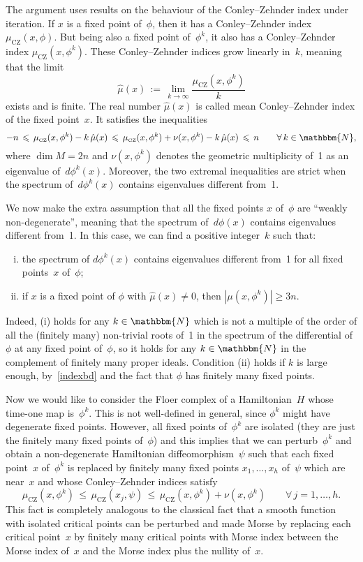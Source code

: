 \documentclass[12pt,twoside]{amsart}
\theoremstyle{plain}
\numberwithin{figure}{section}
\numberwithin{equation}{section}
\def\sCZ{ {\scriptscriptstyle\operatorname{CZ}}}
\def\NN{\mathbbm{N}}
\begin{document}
The argument uses results on the behaviour of the Conley--Zehnder index under iteration. 
If $x$ is a fixed point of~$\phi$, then it has a Conley--Zehnder index $\mu_{\sCZ}(x,\phi)$. 
But being also a fixed point of~$\phi^k$, it also has a Conley--Zehnder index $\mu_{\sCZ}(x,\phi^k)$. 
These Conley--Zehnder indices grow linearly in~$k$, meaning that the limit
\[
\hat{\mu}(x) \,:=\, \lim_{k \rightarrow \infty} \frac{\mu_{\sCZ}(x,\phi^k)}{k}
\]
exists and is finite. The real number $\hat{\mu}(x)$ is called mean Conley--Zehnder index of the fixed point~$x$. It satisfies the inequalities 
\begin{equation}
\label{indexbd}
-n \,\leqslant\,  \mu_{\sCZ}(x,\phi^k) - k \, \hat{\mu}(x) \,\leqslant\, 
\mu_{\sCZ}(x,\phi^k) + \nu(x,\phi^k) - k \, \hat{\mu}(x)  \,\leqslant\, n \qquad \forall\, k\in \NN, 
\end{equation}
%
where $\dim M=2n$ and $\nu(x,\phi^k)$ denotes the geometric multiplicity of~1 as an eigenvalue 
of~$d\phi^k(x)$. Moreover, the two extremal inequalities are strict when the spectrum 
of~$d\phi^k(x)$ contains eigenvalues different from~1.

We now make the extra assumption that all the fixed points $x$ of~$\phi$ are 
``weakly non-degenerate'', meaning that the spectrum of~$d\phi(x)$ contains eigenvalues 
different from~1. In this case, we can find a positive integer~$k$ such that:
\begin{enumerate}[(i)]
\item 
the spectrum of $d\phi^k(x)$ contains eigenvalues different from~1 for all 
fixed points~$x$ of~$\phi$;
\item 
if $x$ is a fixed point of $\phi$ with $\hat{\mu}(x) \neq 0$, then $|\mu(x,\phi^k)| \geqslant 3n$.
\end{enumerate}
Indeed, (i) holds for any $k \in \NN$ which is not a multiple of the order of all
the (finitely many) non-trivial roots of~1 in the spectrum of the differential of~$\phi$ 
at any fixed point of~$\phi$, 
so it holds for any $k \in \NN$ in the complement of finitely many proper ideals. 
Condition (ii) holds if $k$ is large enough, by~\eqref{indexbd} and the fact that $\phi$ 
has finitely many fixed points.

Now we would like to consider the Floer complex of a Hamiltonian~$H$ whose time-one map is~$\phi^k$. This is not well-defined in general, since $\phi^k$ might have degenerate fixed points. 
However, all fixed points of~$\phi^k$ are isolated 
(they are just the finitely many fixed points of~$\phi$) and this implies that we can perturb~$\phi^k$ and obtain a non-degenerate Hamiltonian diffeomorphism~$\psi$ such that each fixed point~$x$ 
of~$\phi^k$ is replaced by finitely many fixed points $x_1,\dots,x_h$ of~$\psi$ which are near~$x$ 
and whose Conley--Zehnder indices satisfy
\[
\mu_{\sCZ}(x,\phi^k) \,\leqslant\, \mu_{\sCZ}(x_j,\psi) \,\leqslant\, 
\mu_{\sCZ}(x,\phi^k) + \nu(x,\phi^k) \qquad \forall \, j=1,\dots,h.
\]
This fact is completely analogous to the classical fact that a smooth function with isolated critical points can be perturbed and made Morse by replacing each critical point~$x$ by finitely many critical points with Morse index between the Morse index of~$x$ and the Morse index plus the nullity of~$x$.
\end{document}
